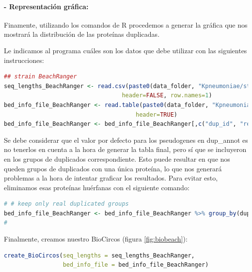 \paragraph{\textbf{- Representación gráfica: }} Finamente, utilizando los comandos de R procedemos a generar la gráfica que nos mostrará la distribución de las proteínas duplicadas. 

Le indicamos al programa cuáles son los datos que debe utilizar con las siguientes instrucciones: 

\vspace{5mm}
\begin{lstlisting}[language=R]
## strain BeachRanger
seq_lengths_BeachRanger <- read.csv(paste0(data_folder, "Kpneumoniae/strain_BeachRanger/length.csv"),
                                  header=FALSE, row.names=1)
bed_info_file_BeachRanger <- read.table(paste0(data_folder, "Kpneumoniae/strain_BeachRanger/dup_annot.csv"), sep=",",
                                      header=TRUE)
bed_info_file_BeachRanger <- bed_info_file_BeachRanger[,c("dup_id", "rec_id", "start", "end", "locus_tag", "product", "strand")]
\end{lstlisting}
\vspace{5mm}

Se debe considerar que el valor por defecto para los pseudogenes en dup\_annot es no tenerlos en cuenta a la hora de generar la tabla final, pero sí que se incluyeron en los grupos de duplicados correspondiente. Esto puede resultar en que nos queden grupos de duplicados con una única proteína, lo que nos generará problemas a la hora de intentar graficar los resultados. Para evitar esto, eliminamos esas proteínas huérfanas con el siguiente comando:

\vspace{5mm}
\begin{lstlisting}[language=R]
# # keep only real duplicated groups
bed_info_file_BeachRanger <- bed_info_file_BeachRanger %>% group_by(dup_id) %>% filter(n() >1)
# 
\end{lstlisting}
\vspace{5mm}

Finalmente, creamos nuestro BioCircos (figura \ref{fig:biobeach}):

\vspace{5mm}
\begin{lstlisting}[language=R]
create_BioCircos(seq_lengths = seq_lengths_BeachRanger,
                 bed_info_file = bed_info_file_BeachRanger)
\end{lstlisting}
\vspace{5mm}

